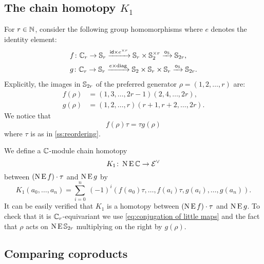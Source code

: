 

\subsection{The chain homotopy $K_1$}

For $r \in \mathbb{N}$, consider the following group homomorphisms where $e$ denotes the identity element:
\[
\begin{split}
	&f \colon \mathbb{C}_r \to \mathbb{S}_r \xrightarrow{\mathsf{id} \times e^{\times r}} \mathbb{S}_r \times \mathbb{S}_2^{\times r} \xrightarrow{\bm{\circ}_{\mathbb{S}}} \mathbb{S}_{2r}, \\
	&g \colon \mathbb{C}_r \to \mathbb{S}_r \xrightarrow{e \times \mathrm{diag}} \mathbb{S}_2 \times \mathbb{S}_r \times \mathbb{S}_r \xrightarrow{\bm{\circ}_{\mathbb{S}}} \mathbb{S}_{2r}.
\end{split}
\]
Explicitly, the images in $\mathbb{S}_{2r}$ of the preferred generator $\rho = (1,2,\dots,r)$ are:
\begin{align*}
	f(\rho) &= (1,3,\dots,2r-1)(2,4,\dots,2r), \\
	g(\rho) &= (1,2,\dots,r)(r+1,r+2,\dots,2r).
\end{align*}
We notice that
\begin{equation}\label{eq:conjugation of little maps}
	f(\rho) \tau = \tau g(\rho)
\end{equation}
where $\tau$ is as in \cref{ss:reordering}.


We define a $\mathbb{C}$-module chain homotopy
\[
K_1 \colon \operatorname{N}\operatorname{E}\mathbb{C} \to \mathcal{E}^\vee
\]
between $(\operatorname{N}\operatorname{E} f) \cdot \tau$ and $\operatorname{N}\operatorname{E} g$ by
\[
K_1(a_0,\dots,a_n) =
\sum_{i=0}^n \ (-1)^i (f(a_0) \tau, \dots, f(a_i) \tau, g(a_i), \dots, g(a_n)).
\]
It can be easily verified that $K_1$ is a homotopy between $(\operatorname{N} \operatorname{E} f) \cdot \tau$ and $\operatorname{N} \operatorname{E} g$.
To check that it is $\mathbb{C}_r$-equivariant we use \cref{eq:conjugation of little maps} and the fact that $\rho$ acts on $\operatorname{N}\operatorname{E}\mathbb{S}_{2r}$ multiplying on the right by $g(\rho)$.

\subsection{Comparing coproducts}

